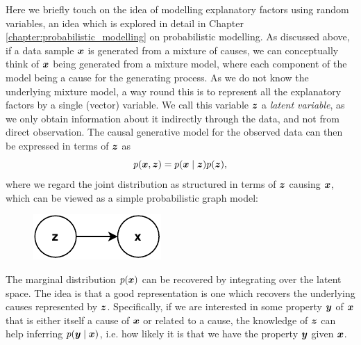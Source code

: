 Here we briefly touch on the idea of modelling explanatory factors using random variables, an idea which is explored in detail in Chapter \ref{chapter:probabilistic_modelling} on probabilistic modelling. As discussed above, if a data sample $\bm{ x }$ is generated from a mixture of causes, we can conceptually think of $\bm{ x }$ being generated from a mixture model, where each component of the model being a cause for the generating process. As we do not know the underlying mixture model, a way round this is to represent all the explanatory factors by a single (vector) variable. We call this variable $\bm{ z }$ a \textit{latent variable}, as we only obtain information about it indirectly through the data, and not from direct observation. The causal generative model for the observed data can then be expressed in terms of $\bm{ z }$ as
\[ p(\bm{ x }, \bm{ z }) = p(\bm{ x } \mid \bm{ z }) p(\bm{ z }), \]
where we regard the joint distribution as structured in terms of $\bm{ z }$ causing $\bm{ x }$, which can be viewed as a simple probabilistic graph model:
\begin{figure}[H]
    \centering
    \includegraphics{report/figures/probabilistic_model.pdf}
    \label{fig:probabilistic_model_graph}
\end{figure}
The marginal distribution $p(\bm{ x })$ can be recovered by integrating over the latent space. The idea is that a good representation is one which recovers the underlying causes represented by $\bm{ z }$. Specifically, if we are interested in some property $\bm{ y }$ of $\bm{ x }$ that is either itself a cause of $\bm{ x }$ or related to a cause, the knowledge of $\bm{ z }$ can help inferring $p(\bm{ y } \mid \bm{ x })$, i.e. how likely it is that we have the property $\bm{ y }$ given $\bm{ x }$.


